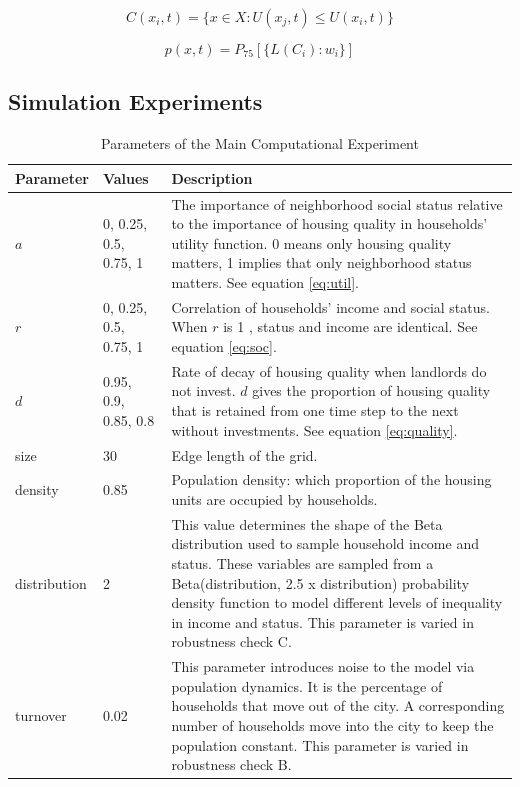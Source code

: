 \documentclass[a4paper,12pt]{article}
\begin{document}
\begin{equation}
C(x_i, t) = \{ x \in X: U(x_j, t) \leq U(x_i, t)  \}
\end{equation}

\begin{equation}
p(x, t) = P_{75}[\{ L(C_i): w_i  \}]
\end{equation}


\subsection*{Simulation Experiments}


\begin{table}[h!]
  \centering
  \caption{Parameters of the Main Computational Experiment}
  \begin{tabularx}{\textwidth}{l l X}
    \hline
    \textbf{Parameter} & \textbf{Values} & \textbf{Description} \\
    \hline
    $a$ & 0, 0.25, 0.5, 0.75, 1 & The importance of neighborhood social status relative 						to the importance of housing quality in households' 							utility function. 0 means only housing quality 									matters, 1 implies that only neighborhood status 								matters. See equation \ref{eq:util}. \\
    $r$ &  0, 0.25, 0.5, 0.75, 1 & Correlation of households' income and social status. 						When $r$ is 1 , status and income are identical. See 							equation \ref{eq:soc}. \\
    $d$ & 0.95, 0.9, 0.85, 0.8 & Rate of decay of housing quality when landlords do not invest. 				$d$ gives the proportion of housing quality that is retained 				from one time step to the next without investments. See 						equation \ref{eq:quality}. \\
    size & 30 & Edge length of the grid. \\
    density & 0.85 & Population density: which proportion of the housing units are occupied by households. \\
    distribution & 2 & This value determines the shape of the Beta distribution used to sample household income and status. These variables are sampled from a 	Beta(distribution, 2.5 x distribution) probability density function to model different levels of inequality in income and status. This parameter is varied in robustness check C.\\
    turnover & 0.02 & This parameter introduces noise to the model via 							population dynamics. It is the percentage of households that move out of the city. A corresponding number of households move into the city to keep the population constant. This parameter is varied in robustness check B.\\

\end{tabularx}
\end{table}
\end{document}
